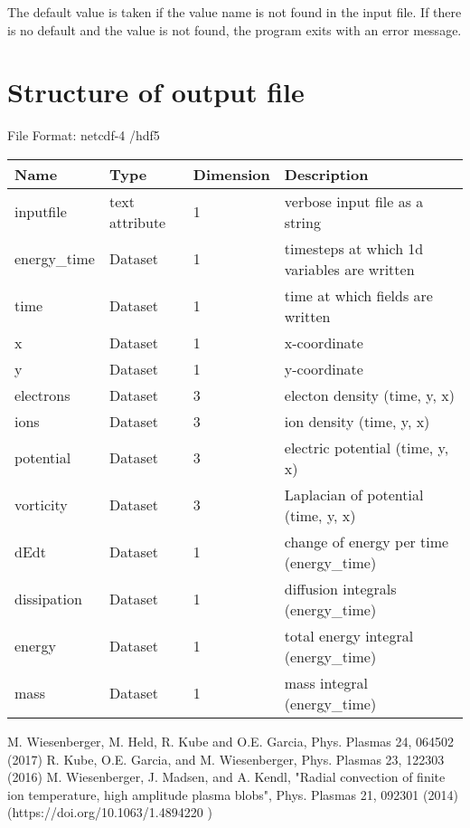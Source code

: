 \documentclass{hitec}
\begin{document}
The default value is taken if the value name is not found in the input file. If there is no default and 
the value is not found, 
the program exits with an error message. 




\section{Structure of output file}
File Format: netcdf-4 /hdf5
%
\begin{longtable}{lllp{8cm}}
\toprule
\rowcolor{gray!50}\bf Name &  \bf Type & \bf Dimension & \bf Description  \\ \midrule
inputfile  &             text attribute & 1 & verbose input file as a string \\ 
energy\_time             & Dataset & 1 & timesteps at which 1d variables are written \\
time                     & Dataset & 1 & time at which fields are written \\
x                        & Dataset & 1 & x-coordinate  \\
y                        & Dataset & 1 & y-coordinate \\
electrons                & Dataset & 3 & electon density (time, y, x) \\
ions                     & Dataset & 3 & ion density (time, y, x) \\
potential                & Dataset & 3 & electric potential (time, y, x) \\
vorticity                & Dataset & 3 & Laplacian of potential (time, y, x) \\
dEdt                     & Dataset & 1 & change of energy per time (energy\_time) \\
dissipation              & Dataset & 1 & diffusion integrals (energy\_time) \\
energy                   & Dataset & 1 & total energy integral (energy\_time) \\
mass                     & Dataset & 1 & mass integral (energy\_time)  \\
\bottomrule
\end{longtable}
\begin{thebibliography}{1}
    M. Wiesenberger, M. Held, R. Kube and O.E. Garcia, Phys. Plasmas { 24}, 064502 (2017)
     \vspace{-8pt} %
    R. Kube, O.E. Garcia, and M. Wiesenberger, Phys. Plasmas {23}, 122303 (2016)
     \vspace{-8pt} %
    M. Wiesenberger, J. Madsen, and A. Kendl, "Radial convection of finite ion temperature, high amplitude plasma blobs", Phys. Plasmas { 21}, 092301 (2014) (https://doi.org/10.1063/1.4894220 )
\end{thebibliography}



\end{document}

